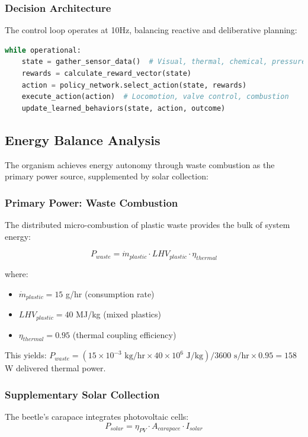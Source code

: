 \subsubsection{Decision Architecture}
The control loop operates at 10Hz, balancing reactive and deliberative planning:

\begin{lstlisting}[language=Python, caption=Simplified consciousness decision loop]
while operational:
    state = gather_sensor_data()  # Visual, thermal, chemical, pressure
    rewards = calculate_reward_vector(state)
    action = policy_network.select_action(state, rewards)
    execute_action(action)  # Locomotion, valve control, combustion
    update_learned_behaviors(state, action, outcome)
\end{lstlisting}

\subsection{Energy Balance Analysis}

The organism achieves energy autonomy through waste combustion as the primary power source, supplemented by solar collection:

\subsubsection{Primary Power: Waste Combustion}
The distributed micro-combustion of plastic waste provides the bulk of system energy:

\begin{equation}
    P_{waste} = \dot{m}_{plastic} \cdot LHV_{plastic} \cdot \eta_{thermal}
\end{equation}

where:
\begin{itemize}
    \item $\dot{m}_{plastic} = 15$ g/hr (consumption rate)
    \item $LHV_{plastic} = 40$ MJ/kg (mixed plastics)
    \item $\eta_{thermal} = 0.95$ (thermal coupling efficiency)
\end{itemize}

This yields: $P_{waste} = (15 \times 10^{-3} \text{ kg/hr} \times 40 \times 10^6 \text{ J/kg}) / 3600 \text{ s/hr} \times 0.95 = 158$ W delivered thermal power.

\subsubsection{Supplementary Solar Collection}
The beetle's carapace integrates photovoltaic cells:
\begin{equation}
    P_{solar} = \eta_{PV} \cdot A_{carapace} \cdot I_{solar}
\end{equation}

